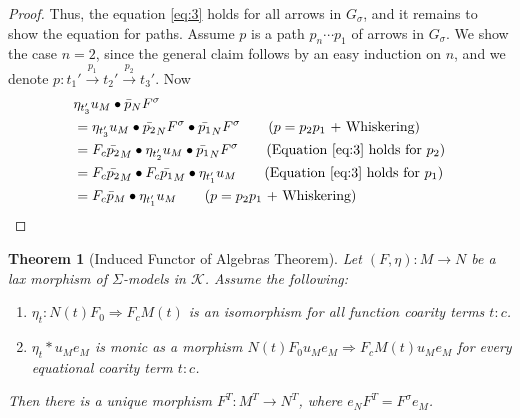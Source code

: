 \documentclass[11pt]{article}
\theoremstyle{plain}
\newtheorem{theorem}{Theorem}[section]
\theoremstyle{definition}
\numberwithin{equation}{section}
\newcommand{\K}{\mathcal{K}}
\begin{document}
\begin{proof}
  Thus, the equation \eqref{eq:3} holds for all arrows in $G_\sigma$, and it remains to show the equation for paths. Assume $p$ is a path $p_n\cdots p_1$ of arrows in $G_\sigma$. We show the case $n = 2$, since the general claim follows by an easy induction on $n$, and we denote $p\colon t_1'\xrightarrow{p_1}t_2'\xrightarrow{p_2}t_3'$. Now
  \begin{align*}
       &\eta_{t_3'}u_M\bullet \bar{p}_NF^\sigma\\
       &= \eta_{t_3'}u_M\bullet \bar{p_2}_NF^\sigma \bullet \bar{p_1}_NF^\sigma \tag{$p = p_2p_1$ + Whiskering}\\
       &= F_c\bar{p_2}_M\bullet \eta_{t_2'}u_M\bullet \bar{p_1}_NF^\sigma \tag{Equation \eqref{eq:3} holds for $p_2$}\\
       &= F_c\bar{p_2}_M\bullet F_c\bar{p_1}_M\bullet \eta_{t_1'}u_M \tag{Equation \eqref{eq:3} holds for $p_1$}\\
       &= F_c\bar{p}_M\bullet \eta_{t_1'}u_M \tag{$p = p_2p_1$ + Whiskering}
  \end{align*}\qedhere

\end{proof}
\begin{theorem}[Induced Functor of Algebras Theorem]\label{thm:induced_morphism_between_algebras}
   Let $(F,\eta)\colon M\to N$ be a lax morphism of $\Sigma$-models in $\K$. Assume the following:
\begin{enumerate}
   \item $\eta_t\colon N(t)F_0\Rightarrow F_cM(t)$ is an isomorphism for all function coarity terms $t\colon c$.
   \item $\eta_t*u_Me_M$ is monic as a morphism $N(t)F_0u_Me_M\Rightarrow F_cM(t)u_Me_M$ for every equational coarity term $t\colon c$.
\end{enumerate}
Then there is a unique morphism $F^T\colon M^T\to N^T$, where $e_N F^T = F^\sigma e_M$.
\end{theorem}
\end{document}

